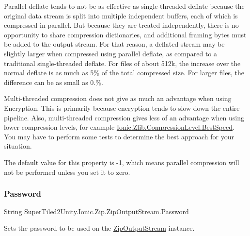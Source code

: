 Parallel deflate tends to not be as effective as single-\/threaded deflate because the original data stream is split into multiple independent buffers, each of which is compressed in parallel. But because they are treated independently, there is no opportunity to share compression dictionaries, and additional framing bytes must be added to the output stream. For that reason, a deflated stream may be slightly larger when compressed using parallel deflate, as compared to a traditional single-\/threaded deflate. For files of about 512k, the increase over the normal deflate is as much as 5\% of the total compressed size. For larger files, the difference can be as small as 0.\%. 

Multi-\/threaded compression does not give as much an advantage when using Encryption. This is primarily because encryption tends to slow down the entire pipeline. Also, multi-\/threaded compression gives less of an advantage when using lower compression levels, for example \mbox{\hyperlink{namespace_super_tiled2_unity_1_1_ionic_1_1_zlib_a20f6771804996c363f454ad9765cd7dba8811d18b7814723c306a299c49e86701}{Ionic.\+Zlib.\+Compression\+Level.\+Best\+Speed}}. You may have to perform some tests to determine the best approach for your situation. 

The default value for this property is -\/1, which means parallel compression will not be performed unless you set it to zero. \mbox{\label{class_super_tiled2_unity_1_1_ionic_1_1_zip_1_1_zip_output_stream_a574733e2d7d17252b7d89f966d588eb9}} 
\subsubsection{\texorpdfstring{Password}{Password}}
{\footnotesize\ttfamily String Super\+Tiled2\+Unity.\+Ionic.\+Zip.\+Zip\+Output\+Stream.\+Password\hspace{0.3cm}{\ttfamily [set]}}



Sets the password to be used on the {\ttfamily \mbox{\hyperlink{class_super_tiled2_unity_1_1_ionic_1_1_zip_1_1_zip_output_stream}{Zip\+Output\+Stream}}} instance. 

